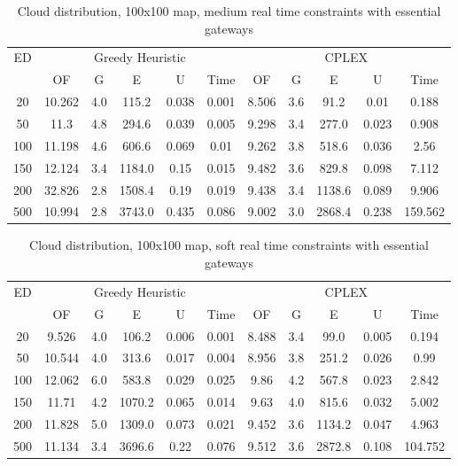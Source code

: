 \begin{table}[htb]
	\centering
	\begin{tabular}{|c|c|c|c|c|c|c|c|c|c|c|}
		\hline
		\multirow{2}{*}{ED} & \multicolumn{5}{c|}{Greedy Heuristic} & \multicolumn{5}{c|}{CPLEX}\\ 
		\cline{2-11}
& OF & G & E & U & Time & OF & G & E & U & Time\\ 
		\hline
		20 & 10.262 & 4.0 & 115.2 & 0.038 & 0.001 & 8.506 & 3.6 & 91.2 & 0.01 & 0.188 \\ 
		50 & 11.3 & 4.8 & 294.6 & 0.039 & 0.005 & 9.298 & 3.4 & 277.0 & 0.023 & 0.908 \\ 
		100 & 11.198 & 4.6 & 606.6 & 0.069 & 0.01 & 9.262 & 3.8 & 518.6 & 0.036 & 2.56 \\ 
		150 & 12.124 & 3.4 & 1184.0 & 0.15 & 0.015 & 9.482 & 3.6 & 829.8 & 0.098 & 7.112 \\ 
		200 & 32.826 & 2.8 & 1508.4 & 0.19 & 0.019 & 9.438 & 3.4 & 1138.6 & 0.089 & 9.906 \\ 
		500 & 10.994 & 2.8 & 3743.0 & 0.435 & 0.086 & 9.002 & 3.0 & 2868.4 & 0.238 & 159.562 \\ 
		\hline 
	\end{tabular} 
	\caption{Cloud distribution, 100x100 map, medium real time constraints with essential gateways} 
	\label{tab:cloud_medium_esc_100} 
\end{table} 

\begin{table}[htb]
	\centering
	\begin{tabular}{|c|c|c|c|c|c|c|c|c|c|c|}
		\hline
		\multirow{2}{*}{ED} & \multicolumn{5}{c|}{Greedy Heuristic} & \multicolumn{5}{c|}{CPLEX}\\ 
		\cline{2-11}
& OF & G & E & U & Time & OF & G & E & U & Time\\ 
		\hline
		20 & 9.526 & 4.0 & 106.2 & 0.006 & 0.001 & 8.488 & 3.4 & 99.0 & 0.005 & 0.194 \\ 
		50 & 10.544 & 4.0 & 313.6 & 0.017 & 0.004 & 8.956 & 3.8 & 251.2 & 0.026 & 0.99 \\ 
		100 & 12.062 & 6.0 & 583.8 & 0.029 & 0.025 & 9.86 & 4.2 & 567.8 & 0.023 & 2.842 \\ 
		150 & 11.71 & 4.2 & 1070.2 & 0.065 & 0.014 & 9.63 & 4.0 & 815.6 & 0.032 & 5.002 \\ 
		200 & 11.828 & 5.0 & 1309.0 & 0.073 & 0.021 & 9.452 & 3.6 & 1134.2 & 0.047 & 4.963 \\ 
		500 & 11.134 & 3.4 & 3696.6 & 0.22 & 0.076 & 9.512 & 3.6 & 2872.8 & 0.108 & 104.752 \\ 
		\hline 
	\end{tabular} 
	\caption{Cloud distribution, 100x100 map, soft real time constraints with essential gateways} 
	\label{tab:cloud_soft_esc_100} 
\end{table} 

